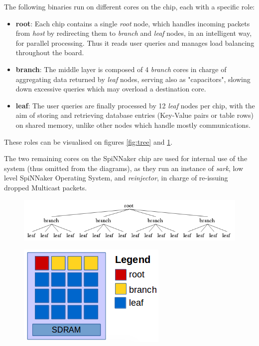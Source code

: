 The following binaries run on different cores on the chip, each with a specific role:
\begin{itemize}
	\item \textbf{root}: Each chip contains a single \textit{root} node, which handles incoming packets from \textit{host} by redirecting them to \textit{branch} and \textit{leaf} nodes, in an intelligent way, for parallel processing. Thus it reads user queries and manages load balancing throughout the board.
	\item \textbf{branch}: The middle layer is composed of 4 \textit{branch} cores in charge of aggregating data returned by \textit{leaf} nodes, serving also as "capacitors", slowing down excessive queries which may overload a destination core.
	\item \textbf{leaf}: The user queries are finally processed by 12 \textit{leaf} nodes per chip, with the aim of storing and retrieving database entries (Key-Value pairs or table rows) on shared memory, unlike other nodes which handle mostly communications.
\end{itemize}
	These roles can be visualised on figures \ref{fig:tree} and \ref{fig:tree-chip}.
	
	The two remaining cores on the SpiNNaker chip are used for internal use of the system (thus omitted from the diagrams), as they run an instance of \textit{sark}, low level SpiNNaker Operating System, and \textit{reinjector}, in charge of re-issuing dropped Multicast packets.
 
\begin{figure}
\centering
\begin{minipage}{1\textwidth}
  \centering
  \includegraphics[width=0.9\linewidth, natwidth=618, natheight=120]{images/tree.png}
  \label{fig:tree}
\end{minipage}
\begin{minipage}{1\textwidth}
  \centering
  \includegraphics[width=0.5\linewidth, natwidth=270, natheight=186]{images/tree-chip.png}
  \label{fig:tree-chip}
\end{minipage}
\end{figure}

